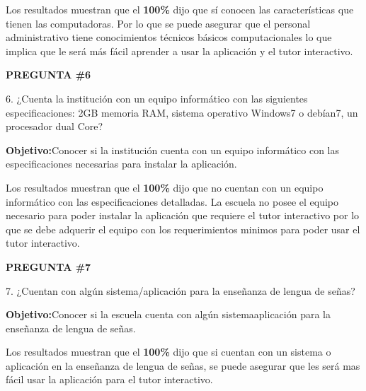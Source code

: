 \documentclass[12pt]{report}%
\begin{document}
Los resultados muestran que el \textbf{ 100\%} dijo que sí conocen las características que tienen las computadoras. Por lo que se puede asegurar que el personal administrativo tiene conocimientos técnicos básicos computacionales lo que implica que le será más fácil aprender a usar la aplicación y el tutor interactivo. 

\newpage
\textbf{PREGUNTA \#6}

6. ¿Cuenta la institución con un equipo informático con las siguientes especificaciones: 2GB memoria RAM, sistema operativo Windows7 o debían7, un procesador dual Core?

\textbf{Objetivo:}Conocer si la institución cuenta con un equipo informático con las especificaciones necesarias para instalar la aplicación.

\begin{center}
\end{center}


Los resultados muestran que el \textbf{ 100\%} dijo que no cuentan con un equipo informático con las especificaciones detalladas. La escuela no posee el equipo necesario para poder instalar la aplicación que requiere el tutor interactivo por lo que se debe adquerir el equipo con los requerimientos minimos para poder usar el tutor interactivo.

\newpage
\textbf{PREGUNTA \#7}

7. ¿Cuentan con algún sistema/aplicación para la enseñanza de lengua de señas?

\textbf{Objetivo:}Conocer si la escuela cuenta con algún sistema\/aplicación para la enseñanza de lengua de señas.

\begin{center}
\end{center}

Los resultados muestran que el \textbf{ 100\%} dijo que si cuentan con un sistema o aplicación en la enseñanza de lengua de señas, se puede asegurar que les será mas fácil usar la aplicación para el tutor interactivo.
\end{document}
